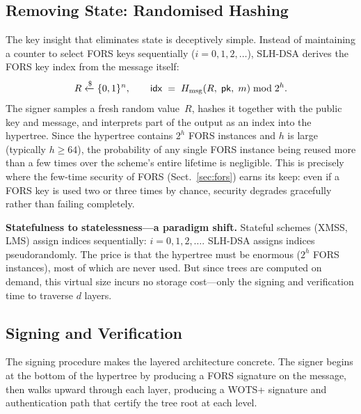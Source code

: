 \subsection{Removing State: Randomised Hashing}
\label{subsec:removing-state}

The key insight that eliminates state is deceptively simple.  Instead of maintaining a counter to select FORS keys sequentially ($i = 0, 1, 2, \ldots$), SLH-DSA derives the FORS key index from the message itself:
\begin{equation}
\label{eq:randomised-index}
R \getsr \{0,1\}^n, \qquad \mathsf{idx} \;=\; H_{\mathrm{msg}}(R,\; \mathsf{pk},\; m) \bmod 2^h.
\end{equation}
The signer samples a fresh random value~$R$, hashes it together with the public key and message, and interprets part of the output as an index into the hypertree.  Since the hypertree contains $2^h$ FORS instances and $h$ is large (typically $h \geq 64$), the probability of any single FORS instance being reused more than a few times over the scheme's entire lifetime is negligible.  This is precisely where the few-time security of FORS (Sect.~\ref{sec:fors}) earns its keep: even if a FORS key is used two or three times by chance, security degrades gracefully rather than failing completely.

\begin{svgraybox}
\textbf{Statefulness to statelessness---a paradigm shift.}  Stateful schemes (XMSS, LMS) assign indices sequentially: $i = 0, 1, 2, \ldots$.  SLH-DSA assigns indices pseudorandomly.  The price is that the hypertree must be enormous ($2^h$ FORS instances), most of which are never used.  But since trees are computed on demand, this virtual size incurs no storage cost---only the signing and verification time to traverse $d$ layers.
\end{svgraybox}

\subsection{Signing and Verification}
\label{subsec:slh-sign-verify}

The signing procedure makes the layered architecture concrete.  The signer begins at the bottom of the hypertree by producing a FORS signature on the message, then walks upward through each layer, producing a WOTS+ signature and authentication path that certify the tree root at each level.

